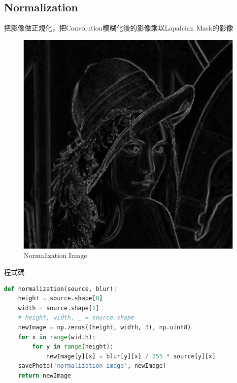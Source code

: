 \documentclass[12pt,a4paper]{article}
\begin{document}
\subsection{Normalization}
{
把影像做正規化，把Convolution模糊化後的影像乘以Lapalcian Mask的影像
\begin{figure}[ht]
\centering
\includegraphics[width=.4\textwidth]{image/normalization_image.png}
\caption{Normalization Image}%
\label{要合併的兩張圖}%
\end{figure}

程式碼
\begin{lstlisting}[language=Python]
def normalization(source, blur):
    height = source.shape[0]
    width = source.shape[1]
    # height, width, _ = source.shape
    newImage = np.zeros((height, width, 3), np.uint8)
    for x in range(width):
        for y in range(height):
            newImage[y][x] = blur[y][x] / 255 * source[y][x]
    savePhoto('normalization_image', newImage)
    return newImage
    
\end{lstlisting}
}
\end{document}
